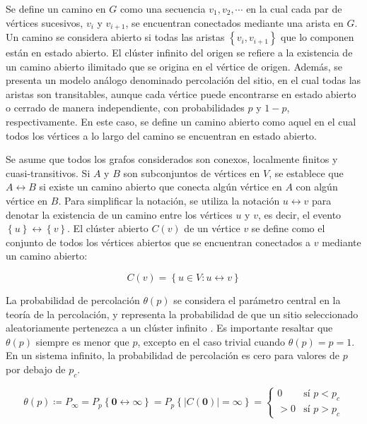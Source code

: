 Se define un camino en $G$ como una secuencia $v_1, v_2, \cdots$ en la cual cada par de vértices sucesivos, $v_i$ y $v_{i +1}$, se encuentran conectados mediante una arista en $G$. Un camino se considera abierto si todas las aristas $\left\{v_i,v_{i+1}\right\}$ que lo componen están en estado abierto. El clúster infinito del origen se refiere a la existencia de un camino abierto ilimitado que se origina en el vértice de origen. Además, se presenta un modelo análogo denominado percolación del sitio, en el cual todas las aristas son transitables, aunque cada vértice puede encontrarse en estado abierto o cerrado de manera independiente, con probabilidades $p$ y $1 - p$, respectivamente. En este caso, se define un camino abierto como aquel en el cual todos los vértices a lo largo del camino se encuentran en estado abierto.

 Se asume que todos los grafos considerados son conexos, localmente finitos y cuasi-transitivos. Si $A$ y $B$ son subconjuntos de vértices en $V$, se establece que $A\leftrightarrow B$ si existe un camino abierto que conecta algún vértice en $A$ con algún vértice en $B$. Para simplificar la notación, se utiliza la notación $u \leftrightarrow v$ para denotar la existencia de un camino entre los vértices $u$ y $v$, es decir, el evento $\left\{u\right\} \leftrightarrow \left\{v\right\}$. El clúster abierto $C(v)$  de un vértice $v$ se define como el conjunto de todos los vértices abiertos que se encuentran conectados a $v$ mediante un camino abierto:

\begin{equation}\label{eq:1}
	C(v) = \left\{u\in V: u \leftrightarrow v \right\}
\end{equation}

La probabilidad de percolación $\theta(p)$  se considera el parámetro central en la teoría de la percolación, y representa la probabilidad de que un sitio seleccionado aleatoriamente pertenezca a un clúster infinito \cite{torquato_percolation_2002}. Es importante resaltar que $\theta(p)$  siempre es menor que $p$, excepto en el caso trivial cuando $\theta(p) = p = 1$. En un sistema infinito, la probabilidad de percolación es cero para valores de $p$ por debajo de $p_c$.


\begin{equation}\label{eq:2}
\theta(p)  \coloneqq P_\infty = P_p\left\{\mathbf{0} \leftrightarrow \infty\right\} = P_p\left\{\left| C(\mathbf{0})\right|=\infty \right\}  = \begin{cases}
	0 & \text{sí } p<p_c\\
	>0 & \text{sí } p>p_c
\end{cases}
\end{equation}

